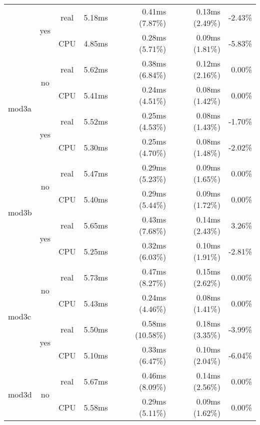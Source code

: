 \documentclass[en]{pracamgr}
\begin{document}
\begin{small}
\begin{longtable}{|l|c|c|r|r|r|r|}
                          \cline{2-7}
                          & \multirow{2}{*}{yes} & real & 5.18ms & 0.41ms (7.87\%) & 0.13ms (2.49\%) & -2.43\% \\*
                          &                      & CPU  & 4.85ms & 0.28ms (5.71\%) & 0.09ms (1.81\%) & -5.83\% \\
\hline
\multirow{4}{*}{mod3a}    & \multirow{2}{*}{no}  & real & 5.62ms & 0.38ms (6.84\%) & 0.12ms (2.16\%) & 0.00\% \\*
                          &                      & CPU  & 5.41ms & 0.24ms (4.51\%) & 0.08ms (1.42\%) & 0.00\% \\*
                          \cline{2-7}
                          & \multirow{2}{*}{yes} & real & 5.52ms & 0.25ms (4.53\%) & 0.08ms (1.43\%) & -1.70\% \\*
                          &                      & CPU  & 5.30ms & 0.25ms (4.70\%) & 0.08ms (1.48\%) & -2.02\% \\
\hline
\multirow{4}{*}{mod3b}    & \multirow{2}{*}{no}  & real & 5.47ms & 0.29ms (5.23\%) & 0.09ms (1.65\%) & 0.00\% \\*
                          &                      & CPU  & 5.40ms & 0.29ms (5.44\%) & 0.09ms (1.72\%) & 0.00\% \\*
                          \cline{2-7}
                          & \multirow{2}{*}{yes} & real & 5.65ms & 0.43ms (7.68\%) & 0.14ms (2.43\%) & 3.26\% \\*
                          &                      & CPU  & 5.25ms & 0.32ms (6.03\%) & 0.10ms (1.91\%) & -2.81\% \\
\hline
\multirow{4}{*}{mod3c}    & \multirow{2}{*}{no}  & real & 5.73ms & 0.47ms (8.27\%) & 0.15ms (2.62\%) & 0.00\% \\*
                          &                      & CPU  & 5.43ms & 0.24ms (4.46\%) & 0.08ms (1.41\%) & 0.00\% \\*
                          \cline{2-7}
                          & \multirow{2}{*}{yes} & real & 5.50ms & 0.58ms (10.58\%) & 0.18ms (3.35\%) & -3.99\% \\*
                          &                      & CPU  & 5.10ms & 0.33ms (6.47\%) & 0.10ms (2.04\%) & -6.04\% \\
\hline
\multirow{4}{*}{mod3d}    & \multirow{2}{*}{no}  & real & 5.67ms & 0.46ms (8.09\%) & 0.14ms (2.56\%) & 0.00\% \\*
                          &                      & CPU  & 5.58ms & 0.29ms (5.11\%) & 0.09ms (1.62\%) & 0.00\% \\*

\end{longtable}
\end{small}
\end{document}
